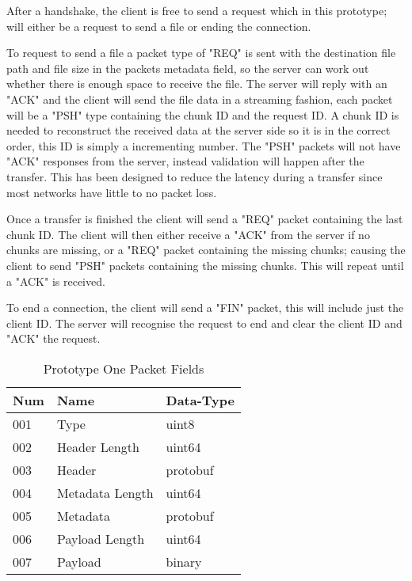 After a handshake, the client is free to send a request which in this prototype; will either be a request to send a file or ending the connection.

To request to send a file a packet type of "REQ" is sent with the destination file path and file size in the packets metadata field, so the server can work out whether there is enough space to receive the file. The server will reply with an "ACK" and the client will send the file data in a streaming fashion, each packet will be a "PSH" type containing the chunk ID and the request ID. A chunk ID is needed to reconstruct the received data at the server side so it is in the correct order, this ID is simply a incrementing number. The "PSH" packets will not have "ACK" responses from the server, instead validation will happen after the transfer. This has been designed to reduce the latency during a transfer since most networks have little to no packet loss.

Once a transfer is finished the client will send a "REQ" packet containing the last chunk ID. The client will then either receive a "ACK" from the server if no chunks are missing, or a "REQ" packet containing the missing chunks; causing the client to send "PSH" packets containing the missing chunks. This will repeat until a "ACK" is received.

To end a connection, the client will send a "FIN" packet, this will include just the client ID. The server will recognise the request to end and clear the client ID and "ACK" the request.

\FloatBarrier

\begin{table}[ht]
	\caption{Prototype One Packet Fields}
	\label{tab:p1d-packet-fields}
	\centering
	\begin{tabular}{ l l l }
		\hline
		\textbf{Num} & \textbf{Name}   & \textbf{Data-Type} \\
		\hline
		001          & Type            & uint8              \\
		\hline
		002          & Header Length   & uint64             \\
		\hline
		003          & Header          & protobuf           \\
		\hline
		004          & Metadata Length & uint64             \\
		\hline
		005          & Metadata        & protobuf           \\
		\hline
		006          & Payload Length  & uint64             \\
		\hline
		007          & Payload         & binary             \\
		\hline
	\end{tabular}
\end{table}

